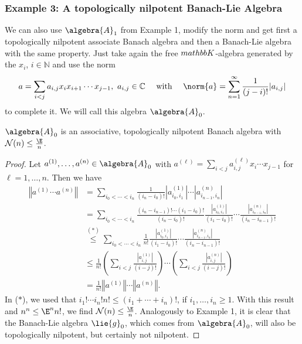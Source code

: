 \documentclass[
11pt,                          %
english                        %
]{article}
\begin{document}
\subsubsection{Example 3: A topologically nilpotent Banach-Lie Algebra}
We can also use $\algebra{A}_1$ from Example 1, modify the norm and get first a 
topologically nilpotent associate Banach algebra and then a Banach-Lie algebra with 
the same property. Just take again the free $\\mathbb{K}$-algebra generated by the 
$x_i$, $i \in \mathbb{N}$ and use the norm
\begin{equation}
	a =
	\sum\limits_{i < j}
	a_{i, j} x_i x_{i + 1} \cdots x_{j - 1}
	, \
	a_{i,j} \in \mathbb{C}
	\quad \text{ with } \quad
	\norm{a}
	=
	\sum\limits_{n = 1}^\infty
	\frac{1}{(j - i)!}|a_{i,j}|
\end{equation}
to complete it. We will call this algebra $\algebra{A}_0$.
\begin{lemma}
	$\algebra{A}_0$ is an associative, topologically nilpotent 
	Banach algebra with $\mathcal{N}(n) \leq \frac{\E}{n}$.
\end{lemma}
\begin{proof}
	Let $a^{(1)}, \ldots, a^{(n)} \in \algebra{A}_0$ with $a^{(\ell)} = \sum_{i < j}
	a_{i,j}^{(\ell)} x_i \cdots x_{j-1}$ for $\ell = 1, \ldots, n$. Then we have
	\begin{align*}
		\left\Vert
			a^{(1)} \cdots a^{(n)}
		\right\Vert
		&=
		\sum\limits_{i_0 < \cdots < i_n}
		\frac{1}{(i_n - i_0)!}
		|a_{i_0, i_1}^{(1)}| \cdots |a_{i_{n-1}, i_n}^{(n)}|
		\\
		&=
		\sum\limits_{i_0 < \cdots < i_n}
		\frac{(i_n - i_{n-1})! \cdots (i_1 - i_0)!}{(i_n - i_0)!}
		\frac{|a_{i_0, i_1}^{(1)}|}{(i_1 - i_0)!} 
		\cdots 
		\frac{|a_{i_{n-1}, i_n}^{(n)}|}{(i_n - i_{n-1})!}
		\\
		& \stackrel{(*)}{\leq}
		\sum\limits_{i_0 < \cdots < i_n}
		\frac{1}{n!}
		\frac{|a_{i_0, i_1}^{(1)}|}{(i_1 - i_0)!} 
		\cdots 
		\frac{|a_{i_{n-1}, i_n}^{(n)}|}{(i_n - i_{n-1})!}
		\\
		& \leq
		\frac{1}{n!}
		\left(
			\sum\limits_{i < j}
			\frac{|a_{i, j}^{(1)}|}{(i - j)!} 
		\right)
		\cdots 
		\left(
			\sum\limits_{i < j}
			\frac{|a_{i, j}^{(n)}|}{(i - j)!} 
		\right)
		\\
		& =
		\frac{1}{n!}
		\left\Vert a^{(1)} \right\Vert
		\cdots
		\left\Vert a^{(n)} \right\Vert.
	\end{align*}
	In ($*$), we used that $i_1! \cdots i_n! n! \leq (i_1 + \cdots + i_n)!$,
	if $i_1, \ldots, i_n \geq 1$. With this result and $n^n \leq \E^n n!$,
	we find $\mathcal{N}(n) \leq \frac{\E}{n}$. Analogously to Example 1, it is 
	clear that the Banach-Lie algebra $\lie{g}_0$, which comes from $\algebra{A}_0$, 
	will also be topologically nilpotent, but certainly not nilpotent.
\end{proof}
\end{document}
